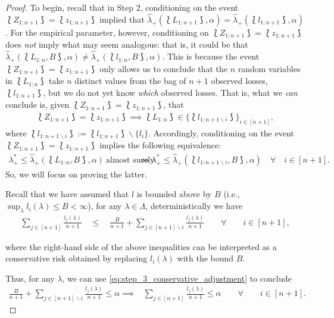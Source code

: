 \begin{proof}
To begin, recall that in Step 2, conditioning on the event $\lbag Z_{1:n+1} \rbag = \lbag z_{1:n+1} \rbag$ implied that $\hat{\lambda}_+(\lbag L_{1:n+1} \rbag, \alpha) = \hat{\lambda}_+(\lbag l_{1:n+1} \rbag, \alpha)$. For the empirical parameter, however, conditioning on $\lbag Z_{1:n+1} \rbag = \lbag z_{1:n+1} \rbag$ does \textit{not} imply what may seem analogous: that is, it could be that $\hat{\lambda}_+(\lbag L_{1:n}, B \rbag, \alpha) \neq \hat{\lambda}_+(\lbag l_{1:n}, B \rbag, \alpha)$. This is because the event $\lbag Z_{1:n+1} \rbag = \lbag z_{1:n+1} \rbag$ only allows us to conclude that the $n$ random variables in $\lbag L_{1:n}\rbag$ take $n$ distinct values from the bag of $n+1$ observed losses, $\lbag l_{1:n+1}\rbag$, but we do not yet know \textit{which} observed losses. That is, what we \textit{can} conclude is, given $\lbag Z_{1:n+1} \rbag = \lbag z_{1:n+1} \rbag$, that
\begin{align*}
    \lbag Z_{1:n+1} \rbag = \lbag z_{1:n+1} \rbag \implies \lbag L_{1:n} \rbag \in \Big\{\lbag l_{1:n+1\backslash i} \rbag \Big\}_{i\in [n+1]},
\end{align*}
where $\lbag l_{1:n+1\backslash i} \rbag := \lbag l_{1:n+1} \rbag \backslash \{l_i\}$. Accordingly, conditioning on the event $\lbag Z_{1:n+1} \rbag = \lbag z_{1:n+1} \rbag$ implies the following equivalence:
\begin{align}\label{eq:oracle_empirical_inequality_equivalences}
    \lambda_+^* \leq \hat\lambda_+(\lbag L_{1:n}, B \rbag, \alpha) \ \text{almost surely} \ & \iff \lambda_+^* \leq \hat\lambda_+(\lbag l_{1:n+1\backslash i}, B \rbag, \alpha) \quad \forall \quad i \in [n+1].
\end{align}
So, we will focus on proving the latter. 




Recall that we have assumed that $l$ is bounded above by $B$ (i.e., $\sup_{\lambda}l_i(\lambda)\leq B < \infty$), for any $\lambda\in \Lambda$, deterministically we have
\begin{align}\label{eq:step_3_conservative_adjustment}
    \sum_{j\in[n+1]}\frac{l_j(\lambda)}{n+1}
    \quad \leq \quad  \frac{B}{n+1} + \sum_{j\in[n+1]\backslash i}\frac{l_j(\lambda)}{n+1} \qquad \forall \qquad i \in [n+1],
\end{align}


where the right-hand side of the above inequalities can be interpreted as a conservative risk obtained by replacing $l_i(\lambda)$ with the bound $B$.


Thus, for any $\lambda$, we can use \eqref{eq:step_3_conservative_adjustment} to conclude
\begin{align}\label{eq:step_3_risk_relation}
    \frac{B}{n+1} + \sum_{j\in[n+1]\backslash i}\frac{l_j(\lambda)}{n+1} \leq \alpha \implies & \sum_{j\in[n+1]}\frac{l_j(\lambda)}{n+1} \leq \alpha \qquad \forall \qquad i \in [n+1].
\end{align}




\end{proof}
